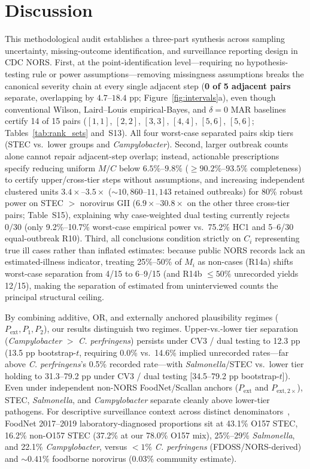 \section{Discussion}\label{sec:discussion}

This methodological audit establishes a three-part synthesis across sampling uncertainty, missing-outcome identification, and surveillance reporting design in CDC NORS. First, at the point-identification level---requiring no hypothesis-testing rule or power assumptions---removing missingness assumptions breaks the canonical severity chain at every single adjacent step (\textbf{0 of 5 adjacent pairs} separate, overlapping by $4.7$--$18.4\text{ pp}$; Figure~\ref{fig:intervals}a), even though conventional Wilson, Laird--Louis empirical-Bayes, and $\delta=0$ MAR baselines certify 14 of 15 pairs ($[1,1]$, $[2,2]$, $[3,3]$, $[4,4]$, $[5,6]$, $[5,6]$; Tables~\ref{tab:rank_sets} and~S13). All four worst-case separated pairs skip tiers (STEC vs.\ lower groups and \textit{Campylobacter}). Second, larger outbreak counts alone cannot repair adjacent-step overlap; instead, actionable prescriptions specify reducing uniform $M/C$ below $6.5\%$--$9.8\%$ ($\ge 90.2\%$--$93.5\%$ completeness) to certify upper/cross-tier steps without assumptions, and increasing independent clustered units $3.4\times$--$3.5\times$ ($\sim 10,860$--$11,143$ retained outbreaks) for 80\% robust power on STEC $>$ norovirus GII ($6.9\times$--$30.8\times$ on the other three cross-tier pairs; Table~S15), explaining why case-weighted dual testing currently rejects $0/30$ (only 9.2\%--10.7\% worst-case empirical power vs.\ 75.2\% HC1 and 5--6/30 equal-outbreak R10). Third, all conclusions condition strictly on $C_i$ representing true ill cases rather than inflated estimates: because public NORS records lack an estimated-illness indicator, treating 25\%--50\% of $M_i$ as non-cases (R14a) shifts worst-case separation from 4/15 to 6--9/15 (and R14b $\le 50\%$ unrecorded yields 12/15), making the separation of estimated from uninterviewed counts the principal structural ceiling.

By combining additive, OR, and externally anchored plausibility regimes ($P_{\mathrm{ext}}, P_1, P_2$), our results distinguish two regimes. Upper-vs.-lower tier separation (\textit{Campylobacter} $>$ \textit{C. perfringens}) persists under CV3 / dual testing to 12.3 pp (13.5 pp bootstrap-$t$, requiring 0.0\% vs.\ 14.6\% implied unrecorded rates---far above \textit{C. perfringens}'s 0.5\% recorded rate---with \textit{Salmonella}/STEC vs.\ lower tier holding to 31.3--79.2 pp under CV3 / dual testing [34.5--79.2 pp bootstrap-$t$]). Even under independent non-NORS FoodNet/Scallan anchors ($P_{\mathrm{ext}}$ and $P_{\mathrm{ext},2\times}$), STEC, \textit{Salmonella}, and \textit{Campylobacter} separate cleanly above lower-tier pathogens. For descriptive surveillance context across distinct denominators~\cite{scallanwalter2025foodborne,scallan2011foodborne}, FoodNet 2017--2019 laboratory-diagnosed proportions sit at 43.1\% O157 STEC, 16.2\% non-O157 STEC (37.2\% at our 78.0\% O157 mix), 25\%--29\% \textit{Salmonella}, and 22.1\% \textit{Campylobacter}, versus $<1\%$ \textit{C. perfringens} (FDOSS/NORS-derived) and $\sim 0.41\%$ foodborne norovirus (0.03\% community estimate).

